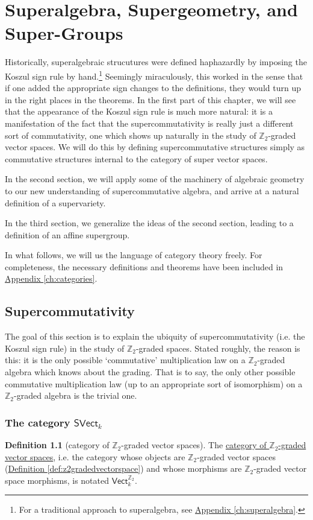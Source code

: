 \documentclass[a4paper,10pt]{scrreprt}
\newcommand{\Z}{\mathbb{Z}}
\newcommand{\defn}[1]{\ul{#1}}
\theoremstyle{definition}
\newtheorem{definition}{Definition}[section]
\theoremstyle{plain}
\theoremstyle{remark}
\begin{document}
\chapter{Superalgebra, Supergeometry, and Super-Groups} \label{ch:superalgebraandsupergeometryincategories}
Historically, superalgebraic strucutures were defined haphazardly by imposing the Koszul sign rule by hand.\footnote{For a traditional approach to superalgebra, see \hyperref[ch:superalgebra]{Appendix \ref*{ch:superalgebra}}.} Seemingly miraculously, this worked in the sense that if one added the appropriate sign changes to the definitions, they would turn up in the right places in the theorems. In the first part of this chapter, we will see that the appearance of the Koszul sign rule is much more natural: it is a manifestation of the fact that the supercommutativity is really just a different sort of commutativity, one which shows up naturally in the study of $\Z_{2}$-graded vector spaces. We will do this by defining supercommutative structures simply as commutative structures internal to the category of super vector spaces. 

In the second section, we will apply some of the machinery of algebraic geometry to our new understanding of supercommutative algebra, and arrive at a natural definition of a supervariety.

In the third section, we generalize the ideas of the second section, leading to a definition of an affine supergroup.

In what follows, we will us the language of category theory freely. For completeness, the necessary definitions and theorems have been included in \hyperref[ch:categories]{Appendix \ref*{ch:categories}}.

\section{Supercommutativity} \label{sec:supercommutativity}
The goal of this section is to explain the ubiquity of supercommutativity (i.e. the Koszul sign rule) in the study of $\Z_{2}$-graded spaces. Stated roughly, the reason is this: it is the only possible `commutative' multiplication law on a $\Z_{2}$-graded algebra which knows about the grading. That is to say, the only other possible commutative multiplication law (up to an appropriate sort of isomorphism) on a $\Z_{2}$-graded algebra is the trivial one. 

\subsection{The category $\mathsf{SVect}_{k}$}
\begin{definition}[category of $\Z_{2}$-graded vector spaces]
  \label{def:categoryofz2gradedvectorspaces}
  The \defn{category of $\Z_{2}$-graded vector spaces}, i.e. the category whose objects are $\Z_{2}$-graded vector spaces (\hyperref[def:z2gradedvectorspace]{Definition \ref*{def:z2gradedvectorspace}}) and whose morphisms are $\Z_{2}$-graded vector space morphisms, is notated $\mathsf{Vect}_{k}^{\Z_{2}}$.
\end{definition}
\end{document}
